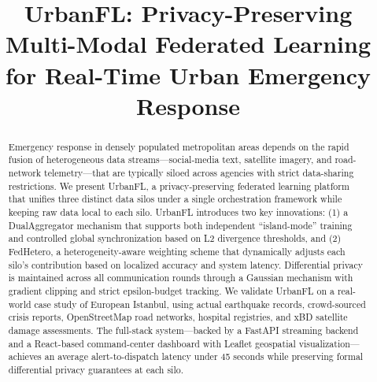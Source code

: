 \documentclass[conference]{IEEEtran}
\begin{document}
\title{UrbanFL: Privacy-Preserving Multi-Modal Federated Learning for Real-Time Urban Emergency Response}

\author{
\and
{}
\and
{}
\and
{}
}

\maketitle

\begin{abstract}
Emergency response in densely populated metropolitan areas depends on the rapid fusion of heterogeneous data streams---social-media text, satellite imagery, and road-network telemetry---that are typically siloed across agencies with strict data-sharing restrictions. We present UrbanFL, a privacy-preserving federated learning platform that unifies three distinct data silos under a single orchestration framework while keeping raw data local to each silo. UrbanFL introduces two key innovations: (1) a DualAggregator mechanism that supports both independent ``island-mode'' training and controlled global synchronization based on L2 divergence thresholds, and (2) FedHetero, a heterogeneity-aware weighting scheme that dynamically adjusts each silo's contribution based on localized accuracy and system latency. Differential privacy is maintained across all communication rounds through a Gaussian mechanism with gradient clipping and strict epsilon-budget tracking. We validate UrbanFL on a real-world case study of European Istanbul, using actual earthquake records, crowd-sourced crisis reports, OpenStreetMap road networks, hospital registries, and xBD satellite damage assessments. The full-stack system---backed by a FastAPI streaming backend and a React-based command-center dashboard with Leaflet geospatial visualization---achieves an average alert-to-dispatch latency under 45 seconds while preserving formal differential privacy guarantees at each silo.
\end{abstract}
\end{document}
